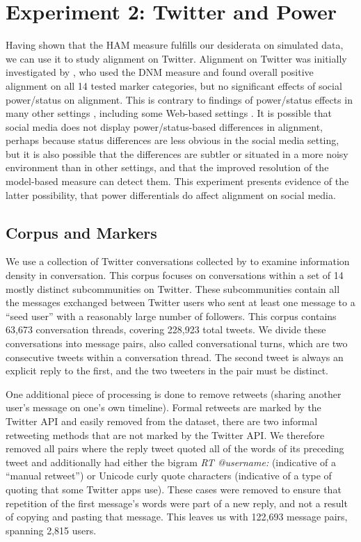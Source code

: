 \documentclass{acm_proc_article-sp}
\begin{document}
\section{Experiment 2: Twitter and Power}
Having shown that the HAM measure fulfills our desiderata on simulated data, we can use it to study alignment on Twitter. Alignment on Twitter was initially investigated by \cite{DNMGamonDumais2011}, who used the DNM measure and found overall positive alignment on all 14 tested marker categories, but no significant effects of social power/status on alignment. This is contrary to findings of power/status effects in many other settings \cite{Gnisci2005}, including some Web-based settings \cite{DNMEtAl2012,NobleFernandez2015}.  It is possible that social media does not display power/status-based differences in alignment, perhaps because status differences are less obvious in the social media setting, but it is also possible that the differences are subtler or situated in a more noisy environment than in other settings, and that the improved resolution of the model-based measure can detect them.  This experiment presents evidence of the latter possibility, that power differentials do affect alignment on social media.

\subsection{Corpus and Markers}
We use a collection of Twitter conversations collected by \cite{DoyleFrank2015CMCL} to examine information density in conversation. This corpus focuses on conversations within a set of 14 mostly distinct subcommunities on Twitter.  These subcommunities contain all the messages exchanged between Twitter users who sent at least one message to a ``seed user'' with a reasonably large number of followers. This corpus contains 63,673 conversation threads, covering 228,923 total tweets.  We divide these conversations into message pairs, also called conversational turns, which are two consecutive tweets within a conversation thread.  The second tweet is always an explicit reply to the first, and the two tweeters in the pair must be distinct.  

One additional piece of processing is done to remove retweets (sharing another user's message on one's own timeline). Formal retweets are marked by the Twitter API and easily removed from the dataset, there are two informal retweeting methods that are not marked by the Twitter API.  We therefore removed all pairs where the reply tweet quoted all of the words of its preceding tweet and additionally had either the bigram \textit{RT @username:} (indicative of a ``manual retweet'') or Unicode curly quote characters (indicative of a type of quoting that some Twitter apps use).  These cases were removed to ensure that repetition of the first message's words were part of a new reply, and not a result of copying and pasting that message. This leaves us with 122,693 message pairs, spanning 2,815 users.
\end{document}
